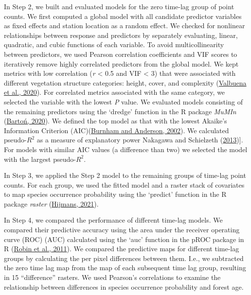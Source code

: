 \documentclass[
]{article}
\begin{document}
In Step 2, we built and evaluated models for the zero time-lag group of point counts. We first computed a global model with all candidate predictor variables as fixed effects and station location as a random effect. We checked for nonlinear relationships between response and predictors by separately evaluating, linear, quadratic, and cubic functions of each variable. To avoid multicollinearity between predictors, we used Pearson correlation coefficients and VIF scores to iteratively remove highly correlated predictors from the global model. We kept metrics with low correlation (\emph{r} \textless{} 0.5 and VIF \textless{} 3) that were associated with different vegetation structure categories: height, cover, and complexity (\protect\hyperlink{ref-valbuenaStandardizingEcosystemMorphological2020}{Valbuena et al., 2020}). For correlated metrics associated with the same category, we selected the variable with the lowest \emph{P} value. We evaluated models consisting of the remaining predictors using the `dredge' function in the R package \emph{MuMIn} (\protect\hyperlink{ref-bartonMuMInMultimodelInference2020}{Bartoń, 2020}). We defined the top model as that with the lowest Akaike's Information Criterion (AIC)(\protect\hyperlink{ref-burnhamModelSelectionMultimodel2002}{Burnham and Anderson, 2002}). We calculated pseudo-\(R^2\) as a measure of explanatory power Nakagawa and Schielzeth (\protect\hyperlink{ref-nakagawaGeneralSimpleMethod2013}{2013}){]}. For models with similar AIC values (a difference than two) we selected the model with the largest pseudo-\(R^2\).

In Step 3, we applied the Step 2 model to the remaining groups of time-lag point counts. For each group, we used the fitted model and a raster stack of covariates to map species occurrence probability using the `predict' function in the R package \emph{raster} (\protect\hyperlink{ref-hijmansRasterGeographicData2021}{Hijmans, 2021}).

In Step 4, we compared the performance of different time-lag models. We compared their predictive accuracy using the area under the receiver operating curve (ROC) (AUC) calculated using the `auc' function in the pROC package in R (\protect\hyperlink{ref-robinPROCOpensourcePackage2011}{Robin et al., 2011}). We compared the predictive maps for different time-lag groups by calculating the per pixel differences between them. I.e., we subtracted the zero time lag map from the map of each subsequent time lag group, resulting in 15 ``difference'' rasters. We used Pearson's correlations to examine the relationship between differences in species occurrence probability and forest age.
\end{document}

